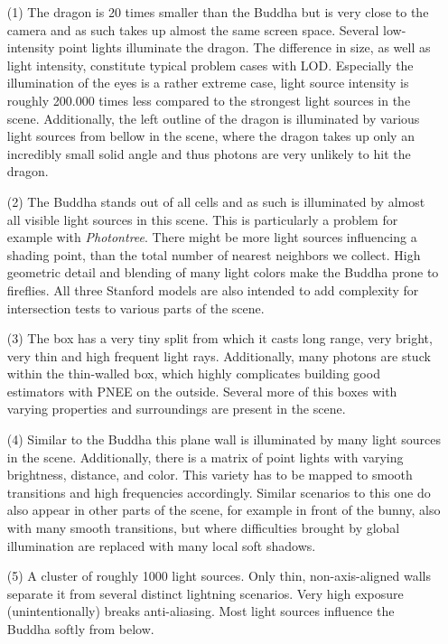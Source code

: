 \begin{itemize}
    \item[(1)] The dragon is 20 times smaller than the Buddha but is very close to the camera and as such takes up almost the same screen space. Several low-intensity point lights illuminate the dragon. The difference in size, as well as light intensity, constitute typical problem cases with LOD. Especially the illumination of the eyes is a rather extreme case, light source intensity is roughly 200.000 times less compared to the strongest light sources in the scene. Additionally, the left outline of the dragon is illuminated by various light sources from bellow in the scene, where the dragon takes up only an incredibly small solid angle and thus photons are very unlikely to hit the dragon.
    \item[(2)] The Buddha stands out of all cells and as such is illuminated by almost all visible light sources in this scene. This is particularly a problem for example with \textit{Photontree}. There might be more light sources influencing a shading point, than the total number of nearest neighbors we collect. High geometric detail and blending of many light colors make the Buddha prone to fireflies.  All three Stanford models are also intended to add complexity for intersection tests to various parts of the scene. 
    \item[(3)] The box has a very tiny split from which it casts long range, very bright, very thin and high frequent light rays. Additionally, many photons are stuck within the thin-walled box, which highly complicates building good estimators with PNEE on the outside. Several more of this boxes with varying properties and surroundings are present in the scene. 
    \item[(4)] Similar to the Buddha this plane wall is illuminated by many light sources in the scene. Additionally, there is a matrix of point lights with varying brightness, distance, and color. This variety has to be mapped to smooth transitions and high frequencies accordingly. Similar scenarios to this one do also appear in other parts of the scene, for example in front of the bunny, also with many smooth transitions, but where difficulties brought by global illumination are replaced with many local soft shadows. 
    \item[(5)] A cluster of roughly 1000 light sources. Only thin, non-axis-aligned walls separate it from several distinct lightning scenarios. Very high exposure (unintentionally) breaks anti-aliasing. Most light sources influence the Buddha softly from below. 

\end{itemize}
